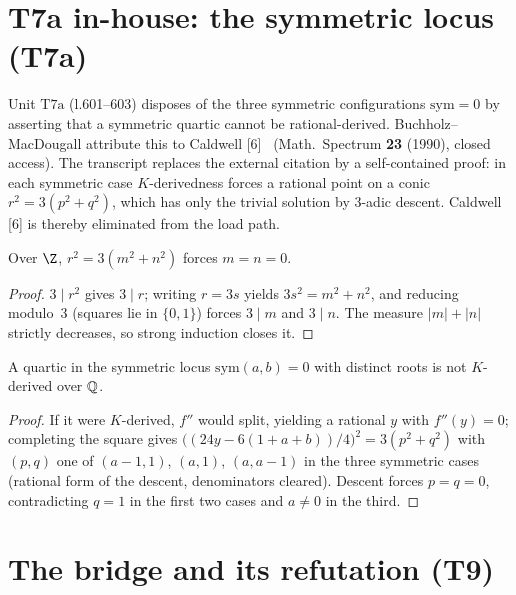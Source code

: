 \section{T7a in-house: the symmetric locus (T7a)}

Unit $\mathrm{T7a}$ (l.601--603) disposes of the three symmetric configurations
$\mathrm{sym}=0$ by asserting that a symmetric quartic cannot be rational-derived.
Buchholz--MacDougall attribute this to Caldwell [6]~\cite{Caldwell1990}
(Math.\ Spectrum \textbf{23} (1990), closed access).  The transcript replaces the
external citation by a
self-contained proof: in each symmetric case $K$-derivedness forces a rational point on
a conic $r^{2}=3(p^{2}+q^{2})$, which has only the trivial solution by $3$-adic descent.
Caldwell [6] is thereby eliminated from the load path.

\begin{theorem}\label{sq_ne_three_mul_sq_add_sq}\leanok
Over $\Z$, $r^{2}=3(m^{2}+n^{2})$ forces $m=n=0$.
\end{theorem}
\begin{proof}\leanok
$3\mid r^{2}$ gives $3\mid r$; writing $r=3s$ yields $3s^{2}=m^{2}+n^{2}$, and reducing
modulo~$3$ (squares lie in $\{0,1\}$) forces $3\mid m$ and $3\mid n$.  The measure
$|m|+|n|$ strictly decreases, so strong induction closes it.
\end{proof}

\begin{theorem}[T7a in-house]\label{symF_zero_not_KDerived}\leanok
{}
A quartic in the symmetric locus $\mathrm{sym}(a,b)=0$ with distinct roots is not
$K$-derived over $\mathbb{Q}$.
\end{theorem}
\begin{proof}\leanok
{}
If it were $K$-derived, $f''$ would split, yielding a rational $y$ with $f''(y)=0$;
completing the square gives $\bigl((24y-6(1+a+b))/4\bigr)^{2}=3(p^{2}+q^{2})$ with
$(p,q)$ one of $(a-1,1)$, $(a,1)$, $(a,a-1)$ in the three symmetric cases (rational form
of the descent, denominators cleared).  Descent forces $p=q=0$, contradicting $q=1$ in
the first two cases and $a\neq 0$ in the third.
\end{proof}

\section{The bridge and its refutation (T9)}

